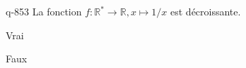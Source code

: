 \begin{truefalse}{q-853}
La fonction $f : \mathbb R^* \to \mathbb R, x\mapsto 1/x$ est décroissante.
\item Vrai
\item* Faux
\end{truefalse}

